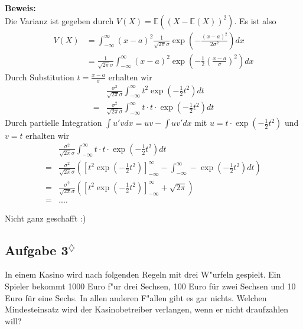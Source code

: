\documentclass[11pt,a4paper,ngerman]{article}
\newcommand{\marcel}{$^\diamondsuit$}
\begin{document}
\textbf{Beweis:}\\
Die Varianz ist gegeben durch $V(X) = \mathbb{E}((X - \mathbb{E}(X))^2)$.
Es ist also
\begin{equation*}\begin{split}
V(X) &= \int_{-\infty}^{\infty} (x-a)^2 \frac{1}{\sqrt{2 \pi} \sigma} \exp\left(- \frac{(x-a)^2}{2\sigma^2} \right) dx \\
&=\frac{1}{\sqrt{2 \pi} \sigma}  \int_{-\infty}^{\infty} (x-a)^2  \exp\left(- \frac{1}{2} \left(  \frac{x-a}{\sigma} \right)^2 \right) dx 
\end{split}\end{equation*}
Durch Substitution $t = \frac{x-a}{\sigma}$ erhalten wir
\begin{equation*}\begin{split}
& \frac{\sigma^2}{\sqrt{2 \pi} \sigma}  \int_{-\infty}^{\infty} t^2  \exp\left(- \frac{1}{2} t^2 \right) dt \\
=& \frac{\sigma^2}{\sqrt{2 \pi} \sigma}  \int_{-\infty}^{\infty} t \cdot t \cdot \exp\left(- \frac{1}{2} t^2 \right) dt
\end{split}\end{equation*}
Durch partielle Integration $\int u' v dx = u v - \int u v' dx$ mit $u =  t \cdot \exp\left(- \frac{1}{2} t^2 \right)$ und $ v = t$ erhalten wir
\begin{equation*}\begin{split}
& \frac{\sigma^2}{\sqrt{2 \pi} \sigma}  \int_{-\infty}^{\infty} t \cdot t \cdot \exp\left(- \frac{1}{2} t^2 \right) dt \\
=& \frac{\sigma^2}{\sqrt{2 \pi} \sigma} \left( \left[  t^2  \exp\left(- \frac{1}{2} t^2 \right)  \right]_{-\infty}^\infty - \int_{-\infty}^{\infty} - \exp\left( -\frac{1}{2} t^2\right) dt \right)\\
=& \frac{\sigma^2}{\sqrt{2 \pi} \sigma} \left( \left[  t^2  \exp\left(- \frac{1}{2} t^2 \right)  \right]_{-\infty}^\infty + \sqrt{2 \pi} \right)\\
=& ....
\end{split}\end{equation*}

Nicht ganz geschafft :)

\subsection*{Aufgabe 3\marcel}

In einem Kasino wird nach folgenden Regeln mit drei W"urfeln gespielt. Ein Spieler
bekommt 1000 Euro f"ur drei Sechsen, 100 Euro für zwei Sechsen und 10 Euro für
eine Sechs. In allen anderen F"allen gibt es gar nichts. Welchen Mindesteinsatz wird
der Kasinobetreiber verlangen, wenn er nicht draufzahlen will?\\
\end{document}
